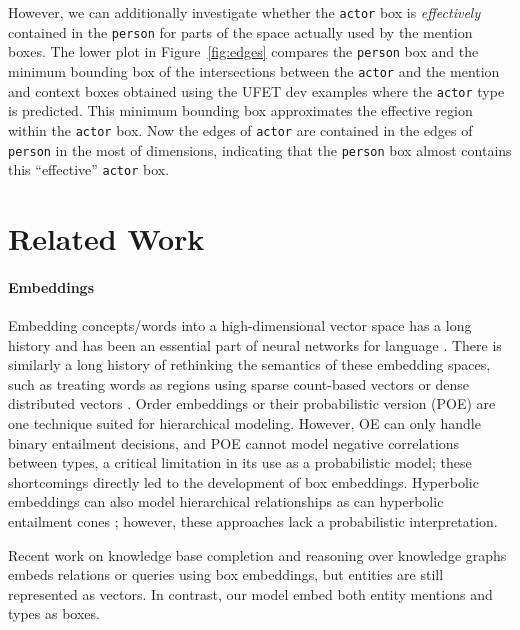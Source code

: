 \documentclass[11pt,a4paper]{article}
\begin{document}
However, we can additionally investigate whether the  {\tt actor} box is \emph{effectively} contained in the  {\tt person} for parts of the space actually used by the mention boxes. The lower plot in Figure~\ref{fig:edges} compares the {\tt person} box and the minimum bounding box of the intersections between the {\tt actor} and the mention and context boxes obtained using the UFET dev examples where the {\tt actor} type is predicted. This minimum bounding box approximates the effective region within the {\tt actor} box. Now the edges of {\tt actor} are contained in the edges of {\tt person} in the most of dimensions, indicating that the {\tt person} box almost contains this ``effective'' {\tt actor} box.


\section{Related Work}

\paragraph{Embeddings} Embedding concepts/words into a high-dimensional vector space \citep{Hinton_86} has a long history and has been an essential part of neural networks for language \citep{Yoshua_Bengio_03, Ronan_Collobert_11}.   
There is similarly a long history of rethinking the semantics of these embedding spaces, such as treating words as regions using sparse count-based vectors \citep{Katrin_Erk_09_b,Katrin_Erk_09_a} or dense distributed vectors \citep{Luke_Vilnis_15}. Order embeddings \citep{Ivan_Vendrov_16} or their probabilistic version (POE) \citep{Alice_Lai_17} are one technique suited for hierarchical modeling. However, OE can only handle binary entailment decisions, and POE cannot model negative correlations between types, a critical limitation in its use as a probabilistic model; these shortcomings directly led to the development of box embeddings. Hyperbolic embeddings \cite{NickelKiela2017,Federico_Lopez_20} can also model hierarchical relationships as can hyperbolic entailment cones \cite{Octavian_Eugen_Ganea_18}; however, these approaches lack a probabilistic interpretation.

Recent work on knowledge base completion \citep{Ralph_Abboud_20} and reasoning over knowledge graphs \citep{Hongyu_Ren_20} embeds relations or queries using box embeddings, but entities are still represented as vectors. In contrast, our model embed both entity mentions and types as boxes.
\end{document}
